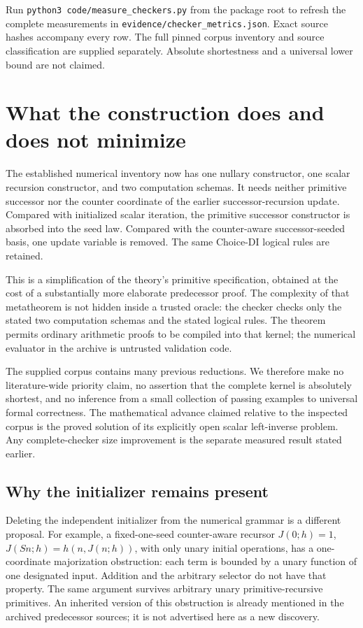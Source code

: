 \documentclass[11pt,letterpaper]{article}
\theoremstyle{definition}\newtheorem{definition}[theorem]{Definition}
\theoremstyle{remark}\newtheorem{remark}[theorem]{Remark}
\begin{document}
Run \texttt{python3 code/measure\_checkers.py} from the package root to
refresh the complete measurements in
\texttt{evidence/checker\_metrics.json}. Exact source hashes accompany
every row. The full pinned corpus inventory and source classification
are supplied separately. Absolute shortestness and a universal lower
bound are not claimed.


\section{What the construction does and does not minimize}

The established numerical inventory now has one nullary constructor,
one scalar recursion constructor, and two computation schemas. It needs
neither primitive successor nor the counter coordinate of the earlier
successor-recursion update. Compared with initialized scalar iteration,
the primitive successor constructor is absorbed into the seed law.
Compared with the counter-aware successor-seeded basis, one update
variable is removed. The same Choice-DI logical rules are retained.

This is a simplification of the theory's primitive specification, obtained
at the cost of a substantially more elaborate predecessor proof. The
complexity of that metatheorem is not hidden inside a trusted oracle:
the checker checks only the stated two computation schemas and the stated
logical rules. The theorem permits ordinary arithmetic proofs to be
compiled into that kernel; the numerical evaluator in the archive is
untrusted validation code.

The supplied corpus contains many previous reductions. We therefore
make no literature-wide priority claim, no assertion that the complete
kernel is absolutely shortest, and no inference from a small collection
of passing examples to universal formal correctness. The mathematical
advance claimed relative to the inspected corpus is the proved solution
of its explicitly open scalar left-inverse problem. Any complete-checker
size improvement is the separate measured result stated earlier.

\subsection{Why the initializer remains present}

Deleting the independent initializer from the numerical grammar is a
different proposal. For example, a fixed-one-seed counter-aware recursor
$J(0;h)=1$, $J(Sn;h)=h(n,J(n;h))$, with only unary initial operations,
has a one-coordinate majorization obstruction: each term is bounded by
a unary function of one designated input. Addition and the arbitrary
selector do not have that property. The same argument survives arbitrary
unary primitive-recursive primitives. An inherited version of this
obstruction is already mentioned in the archived predecessor sources;
it is not advertised here as a new discovery.
\end{document}
